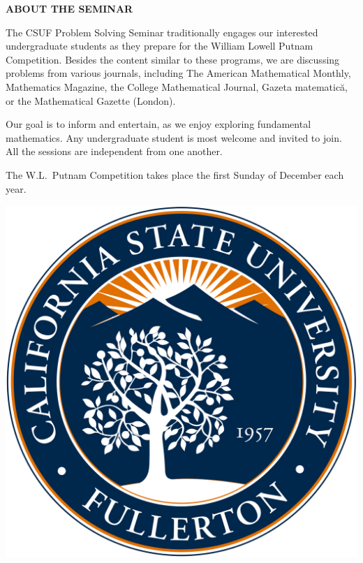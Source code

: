 \documentclass[a4paper]{article}
\begin{document}
\begin{minipage}{0.95\textwidth}
\begin{minipage}[b]{0.47\textwidth}
{\large\raggedright
{\textbf{\color{csecondary}ABOUT THE SEMINAR}}\par
}
\normalsize
\smallskip

The CSUF Problem Solving Seminar traditionally engages our interested undergraduate students as they prepare for
the William Lowell Putnam Competition. Besides the content similar to these programs, we are discussing problems
from various journals, including The American Mathematical Monthly, Mathematics Magazine, the College
Mathematical Journal, Gazeta matematică, or the Mathematical Gazette (London).

\medskip

Our goal is to inform and entertain, as we enjoy exploring fundamental mathematics. Any undergraduate student is
most welcome and invited to join. All the sessions are independent from one another.

\medskip

The W.L.~Putnam Competition takes place the first Sunday of December each year.
\begin{center}
\includegraphics[width=0.55\linewidth]{csuf_seal.png}
\end{center}
\smallskip


\end{minipage}
\end{minipage}
\end{document}
